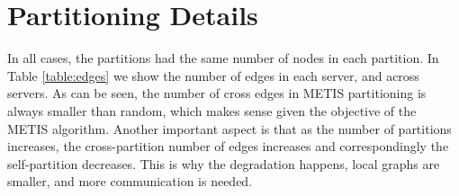 \section{Partitioning Details}
In all cases, the partitions had the same number of nodes in each partition. In Table \ref{table:edges} we show the number of edges in each server, and across servers. As can be seen, the number of cross edges in METIS partitioning is always smaller than random, which makes sense given the objective of the METIS algorithm. Another important aspect is that as the number of partitions increases, the cross-partition number of edges increases and correspondingly the self-partition decreases. This is why the degradation happens, local graphs are smaller, and more communication is needed.







